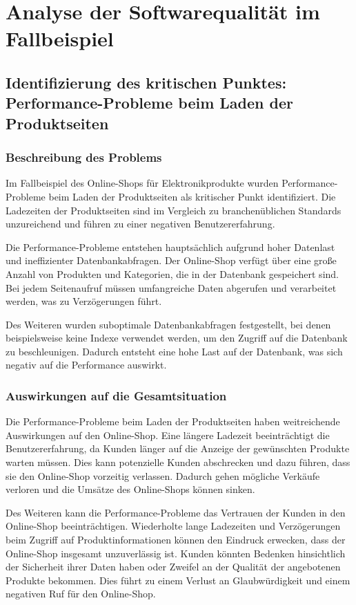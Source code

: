 \section{Analyse der Softwarequalität im Fallbeispiel}

\subsection{Identifizierung des kritischen Punktes: Performance-Probleme beim Laden der Produktseiten}

\subsubsection{Beschreibung des Problems}

Im Fallbeispiel des Online-Shops für Elektronikprodukte wurden Performance-Probleme beim Laden der Produktseiten als kritischer Punkt identifiziert. Die Ladezeiten der Produktseiten sind im Vergleich zu branchenüblichen Standards unzureichend und führen zu einer negativen Benutzererfahrung.

Die Performance-Probleme entstehen hauptsächlich aufgrund hoher Datenlast und ineffizienter Datenbankabfragen. Der Online-Shop verfügt über eine große Anzahl von Produkten und Kategorien, die in der Datenbank gespeichert sind. Bei jedem Seitenaufruf müssen umfangreiche Daten abgerufen und verarbeitet werden, was zu Verzögerungen führt.

Des Weiteren wurden suboptimale Datenbankabfragen festgestellt, bei denen beispielsweise keine Indexe verwendet werden, um den Zugriff auf die Datenbank zu beschleunigen. Dadurch entsteht eine hohe Last auf der Datenbank, was sich negativ auf die Performance auswirkt.

\subsubsection{Auswirkungen auf die Gesamtsituation}

Die Performance-Probleme beim Laden der Produktseiten haben weitreichende Auswirkungen auf den Online-Shop. Eine längere Ladezeit beeinträchtigt die Benutzererfahrung, da Kunden länger auf die Anzeige der gewünschten Produkte warten müssen. Dies kann potenzielle Kunden abschrecken und dazu führen, dass sie den Online-Shop vorzeitig verlassen. Dadurch gehen mögliche Verkäufe verloren und die Umsätze des Online-Shops können sinken.

Des Weiteren kann die Performance-Probleme das Vertrauen der Kunden in den Online-Shop beeinträchtigen. Wiederholte lange Ladezeiten und Verzögerungen beim Zugriff auf Produktinformationen können den Eindruck erwecken, dass der Online-Shop insgesamt unzuverlässig ist. Kunden könnten Bedenken hinsichtlich der Sicherheit ihrer Daten haben oder Zweifel an der Qualität der angebotenen Produkte bekommen. Dies führt zu einem Verlust an Glaubwürdigkeit und einem negativen Ruf für den Online-Shop.

